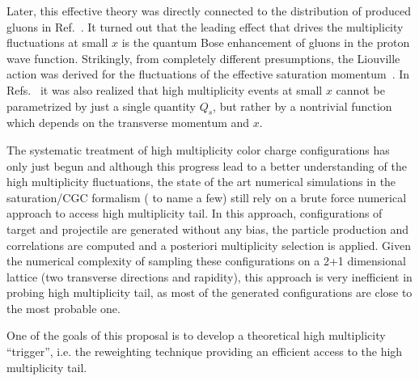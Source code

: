 Later, this effective theory was directly connected to 
the distribution of produced gluons in Ref.~\cite{Kovner:2018azs}. 
It turned out that the leading effect that drives the multiplicity 
fluctuations at small $x$ is the quantum Bose enhancement of gluons in the
proton wave function. Strikingly, from completely different presumptions,
the Liouville action was derived for the fluctuations of the effective saturation 
momentum~\cite{Iancu:2004es,Marquet:2006xm,Iancu:2007st}. 
In Refs.~\cite{Dumitru:2017cwt,Dumitru:2017ftq,Dumitru:2018iko} 
it was also realized that high multiplicity events at small $x$ 
cannot be parametrized by just a single  quantity  $Q_s$, 
but rather by a nontrivial function which depends on the transverse 
momentum and $x$. 

The systematic treatment of high multiplicity 
color charge configurations has only just begun and  
although this progress lead to a better understanding of the high multiplicity fluctuations, 
the state of the art numerical simulations in the saturation/CGC formalism 
(\cite{Mantysaari:2017cni,Mace:2018vwq,Mace:2018yvl} to name a few)
still rely 
on a brute force numerical approach to access high multiplicity tail. 
In this approach, configurations of target and projectile are generated 
without any bias, the particle production and correlations are computed and a posteriori 
multiplicity selection is applied. 
Given the numerical complexity of sampling these configurations  on a 2+1 dimensional lattice
(two transverse directions and rapidity),  
this approach  is very inefficient in probing 
high multiplicity tail, as most of the generated configurations are close to the most probable 
one. 

One of the goals of this proposal is to develop a theoretical high multiplicity ``trigger'', 
i.e. the reweighting technique providing  an efficient access to the high multiplicity tail.   

